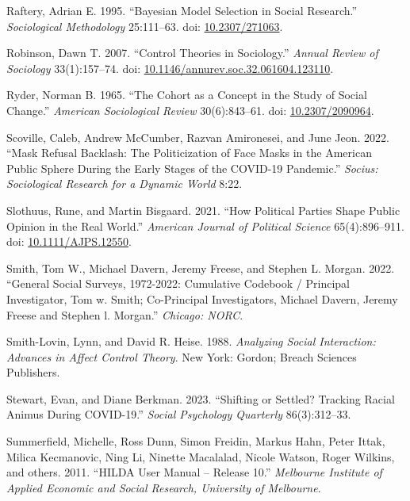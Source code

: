 \documentclass[
  12pt,
]{article}
\newlength{\cslhangindent}
\newlength{\cslentryspacingunit} %
\newenvironment{CSLReferences}[2] %
 {%
  \setlength{\parindent}{0pt}
  \ifodd #1
  \let\oldpar\par
  \def\par{\hangindent=\cslhangindent\oldpar}
  \fi
  \setlength{\parskip}{#2\cslentryspacingunit}
 }%
 {}
\begin{document}
\begin{CSLReferences}{1}{0}
\leavevmode{}%
Raftery, Adrian E. 1995. {``Bayesian {Model} {Selection} in {Social}
{Research}.''} \emph{Sociological Methodology} 25:111--63. doi:
\href{https://doi.org/10.2307/271063}{10.2307/271063}.

\leavevmode{}%
Robinson, Dawn T. 2007. {``Control {Theories} in {Sociology}.''}
\emph{Annual Review of Sociology} 33(1):157--74. doi:
\href{https://doi.org/10.1146/annurev.soc.32.061604.123110}{10.1146/annurev.soc.32.061604.123110}.

\leavevmode{}%
Ryder, Norman B. 1965. {``The {Cohort} as a {Concept} in the {Study} of
{Social} {Change}.''} \emph{American Sociological Review} 30(6):843--61.
doi: \href{https://doi.org/10.2307/2090964}{10.2307/2090964}.

\leavevmode{}%
Scoville, Caleb, Andrew McCumber, Razvan Amironesei, and June Jeon.
2022. {``Mask {Refusal} {Backlash}: {The} {Politicization} of {Face}
{Masks} in the {American} {Public} {Sphere} During the {Early} {Stages}
of the {COVID}-19 {Pandemic}.''} \emph{Socius: Sociological Research for
a Dynamic World} 8:22.

\leavevmode{}%
Slothuus, Rune, and Martin Bisgaard. 2021. {``How {Political} {Parties}
{Shape} {Public} {Opinion} in the {Real} {World}.''} \emph{American
Journal of Political Science} 65(4):896--911. doi:
\href{https://doi.org/10.1111/AJPS.12550}{10.1111/AJPS.12550}.

\leavevmode{}%
Smith, Tom W., Michael Davern, Jeremy Freese, and Stephen L. Morgan.
2022. {``General Social Surveys, 1972-2022: Cumulative Codebook /
Principal Investigator, Tom w. Smith; Co-Principal Investigators,
Michael Davern, Jeremy Freese and Stephen l. Morgan.''} \emph{Chicago:
NORC}.

\leavevmode{}%
Smith-Lovin, Lynn, and David R. Heise. 1988. \emph{Analyzing {Social}
{Interaction}: {Advances} in {Affect} {Control} {Theory}}. New York:
Gordon; Breach Sciences Publishers.

\leavevmode{}%
Stewart, Evan, and Diane Berkman. 2023. {``Shifting or Settled? Tracking
Racial Animus During COVID-19.''} \emph{Social Psychology Quarterly}
86(3):312--33.

\leavevmode{}%
Summerfield, Michelle, Ross Dunn, Simon Freidin, Markus Hahn, Peter
Ittak, Milica Kecmanovic, Ning Li, Ninette Macalalad, Nicole Watson,
Roger Wilkins, and others. 2011. {``HILDA User Manual -- Release 10.''}
\emph{Melbourne Institute of Applied Economic and Social Research,
University of Melbourne}.


\end{CSLReferences}
\end{document}
